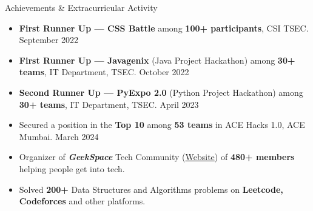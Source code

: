\documentclass{resume} %
\begin{document}
\begin{rSection}{Achievements \& Extracurricular Activity}
    \begin{itemize}
        \setlength\itemsep{-0.6em}
        \item \textbf{First Runner Up — CSS Battle} among \textbf{100+ participants}, CSI TSEC. \hfill {September 2022}
        \item \textbf{First Runner Up — Javagenix} (Java Project Hackathon) among \textbf{30+ teams}, IT Department, TSEC. \hfill {October 2022}
        \item \textbf{Second Runner Up — PyExpo 2.0} (Python Project Hackathon) among \textbf{30+ teams}, IT Department, TSEC. \hfill {April 2023}
        \item Secured a position in the \textbf{Top 10} among \textbf{53 teams} in ACE Hacks 1.0, ACE Mumbai. \hfill{March 2024}
        \item Organizer of \textbf{\textit{GeekSpace}} Tech Community (\href{https://geekspaceclub.xyz}{Website}) of \textbf{480+ members} helping people get into tech.
        \item Solved \textbf{200+} Data Structures and Algorithms problems on \textbf{Leetcode, Codeforces} and other platforms.
    \end{itemize}


\end{rSection}



\end{document}
